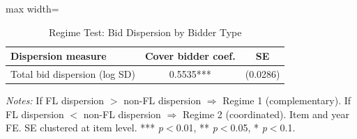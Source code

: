 \begin{table}[htbp]
\centering
\caption{Regime Test: Bid Dispersion by Bidder Type}
\label{tab:regime_test}
\begin{adjustbox}{max width=\textwidth}
\begin{threeparttable}
\small
\begin{tabular}{lcc}
\toprule
Dispersion measure & Cover bidder coef. & SE \\
\midrule
Total bid dispersion (log SD) & 0.5535*** & (0.0286) \\
\bottomrule
\end{tabular}
\begin{tablenotes}
\small
\item \textit{Notes:} If FL dispersion $>$ non-FL dispersion $\Rightarrow$ Regime 1 (complementary).
If FL dispersion $<$ non-FL dispersion $\Rightarrow$ Regime 2 (coordinated).
Item and year FE. SE clustered at item level.
*** \textit{p}$<$0.01, ** \textit{p}$<$0.05, * \textit{p}$<$0.1.
\end{tablenotes}
\end{threeparttable}
\end{adjustbox}
\end{table}
